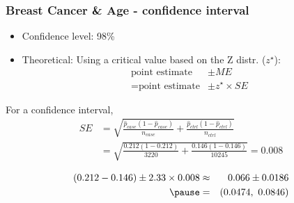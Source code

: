 \documentclass[slidestop,compress,mathserif,12pt,t,professionalfonts,xcolor=table]{beamer}
\begin{document}

\begin{frame}
\frametitle{Breast Cancer \& Age - confidence interval}

\begin{itemize}

\item Confidence level: 98\%

\pause

\item Theoretical: Using a critical value based on the Z distr. ($z^\star$):
\begin{align*} 
\text{point estimate} &\pm ME \\
= \text{point estimate} &\pm z^\star \times SE
\end{align*}

\end{itemize}

\pause

For a confidence interval, 
\begin{align*}
SE &= \sqrt{\frac{\hat{p}_{case}(1-\hat{p}_{case})}{n_{case}} + \frac{\hat{p}_{ctrl}(1-\hat{p}_{ctrl})}{n_{ctrl}} } \\
   &= \sqrt{\frac{0.212(1-0.212)}{3220} + \frac{0.146(1-0.146)}{10245}} = 0.008 
\end{align*}
\pause

\begin{eqnarray*}
(0.212 - 0.146) \pm 2.33 \times 0.008 &\approx& 0.066 \pm 0.0186 \\
\pause
&=& (0.0474,~0.0846)
\end{eqnarray*}

\end{frame}
\end{document}
